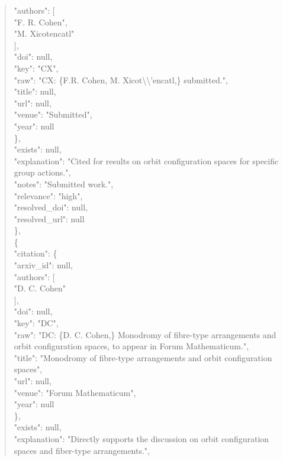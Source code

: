 \documentclass[11pt]{article}
\begin{document}
\begin{quote}
        "authors": [\\
          "F. R. Cohen",\\
          "M. Xicotencatl"\\
        ],\\
        "doi": null,\\
        "key": "CX",\\
        "raw": "CX: \{F.R. Cohen, M. Xicot\textbackslash{}\textbackslash{}'encatl,\} submitted.",\\
        "title": null,\\
        "url": null,\\
        "venue": "Submitted",\\
        "year": null\\
      \},\\
      "exists": null,\\
      "explanation": "Cited for results on orbit configuration spaces for specific group actions.",\\
      "notes": "Submitted work.",\\
      "relevance": "high",\\
      "resolved\_doi": null,\\
      "resolved\_url": null\\
    \},\\
    \{\\
      "citation": \{\\
        "arxiv\_id": null,\\
        "authors": [\\
          "D. C. Cohen"\\
        ],\\
        "doi": null,\\
        "key": "DC",\\
        "raw": "DC: \{D. C. Cohen,\} Monodromy of fibre-type arrangements and orbit configuration spaces, to appear in Forum Mathematicum.",\\
        "title": "Monodromy of fibre-type arrangements and orbit configuration spaces",\\
        "url": null,\\
        "venue": "Forum Mathematicum",\\
        "year": null\\
      \},\\
      "exists": null,\\
      "explanation": "Directly supports the discussion on orbit configuration spaces and fiber-type arrangements.",\\

\end{quote}
\end{document}
